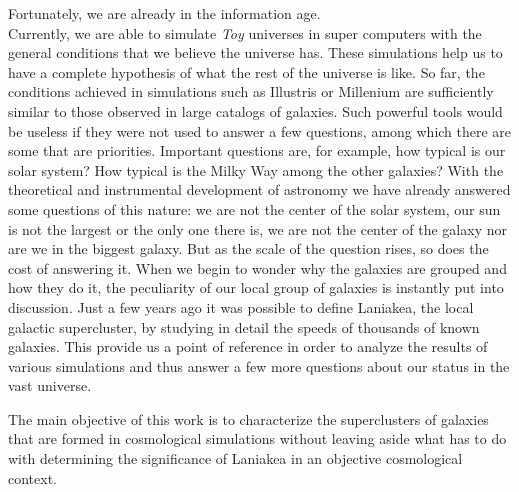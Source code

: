 Fortunately, we are already in the information age.\\


Currently, we are able to simulate \emph{Toy} universes in super computers with the general conditions that we believe the universe has. These simulations help us to have a complete hypothesis of what the rest of the universe is like. So far, the conditions achieved in simulations such as Illustris\cite{IllustrisHome} or Millenium\cite{MilleniumHome} are sufficiently similar to those observed in large catalogs of galaxies. Such  powerful tools would be useless if they were not used to answer a few questions, among which there are some that are priorities. Important questions are, for example, how typical is our solar system? How typical is the Milky Way among the other galaxies?
With the theoretical and instrumental development of astronomy we have already answered some questions of this nature: we are not the center of the solar system, our sun is not the largest or the only one there is, we are not the center of the galaxy nor are we in the biggest galaxy. But as the scale of the question rises, so does the cost of answering it. When we begin to wonder why the galaxies are grouped and how they do it, the peculiarity of our local group of galaxies is instantly put into discussion. Just a few years ago it was possible to define Laniakea, the local galactic supercluster, by studying in detail the speeds of thousands of known galaxies\cite{NatureTully}. This provide us a point of reference in order to analyze the results of various simulations and thus answer a few more questions about our status in the vast universe.

The main objective of this work is to characterize the superclusters of galaxies that are formed in cosmological simulations without leaving aside what has to do with determining the significance of Laniakea in an objective cosmological context.


